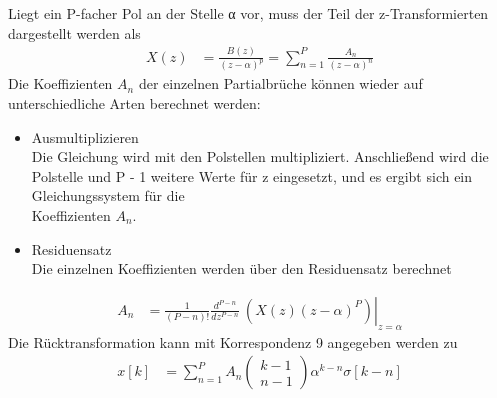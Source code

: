 Liegt ein P-facher Pol an der Stelle α vor, muss der Teil der z-Transformierten dargestellt werden als
\begin{align}
X(z) &= \frac{B(z)}{(z - \alpha)^{p}} = \sum\limits_{n = 1}^{P}\frac{A_{n}}{(z - \alpha)^{n}} \label{eq:5.104}
\end{align}
Die Koeffizienten \(A_{n}\) der einzelnen Partialbrüche können wieder auf unterschiedliche Arten berechnet werden:

\begin{itemize}
\item
  Ausmultiplizieren\\
  Die Gleichung wird mit den Polstellen multipliziert. Anschließend wird die Polstelle und P - 1 weitere Werte für z eingesetzt, und es ergibt sich ein Gleichungssystem für die\\
  Koeffizienten \(A_{n}\).
\item
  Residuensatz\\
  Die einzelnen Koeffizienten werden über den Residuensatz berechnet
\end{itemize}
\begin{align}
A_{n} &= \frac{1}{(P - n)!}  \frac{d^{P - n}}{dz^{P - n}}\left. \ \left( X(z)  (z - \alpha)^{P} \right) \right|_{z = \alpha} \label{eq:5.105}
\end{align}
Die Rücktransformation kann mit Korrespondenz 9 angegeben werden zu
\begin{align}
x[ k] &= \sum\limits_{n = 1}^{P}{A_{n}  \left( \begin{array}{r}
k - 1 \\
n - 1
\end{array} \right)  \alpha^{k - n}  \sigma[ k - n]} \label{eq:5.106}
\end{align}
